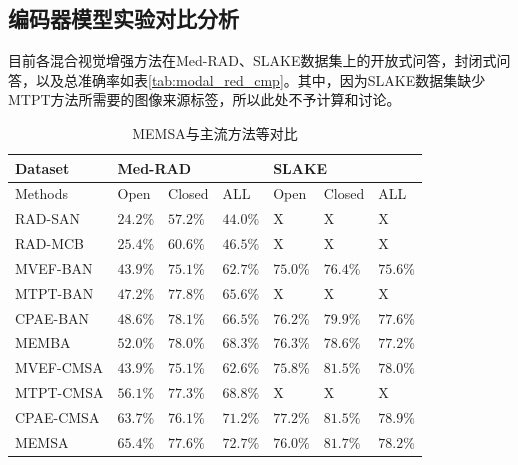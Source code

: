 \subsection{编码器模型实验对比分析}
目前各混合视觉增强方法在Med-RAD、SLAKE数据集上的开放式问答，封闭式问答，以及总准确率如表\ref{tab:modal_red_cmp}。其中，因为SLAKE数据集缺少MTPT方法所需要的图像来源标签，所以此处不予计算和讨论。
\begin{table}
	\caption{\label{tab:modal_red_cmp1}MEMSA与主流方法等对比}
	\centering
	\small
	\begin{tabular}{l|lll|lll}
		\hline Dataset & \multicolumn{3}{l}{\textbf{Med-RAD}} & \multicolumn{3}{|l}{\textbf{SLAKE}} \\ 
		\hline Methods & Open & Closed & ALL & Open & Closed & ALL\\
		\hline RAD-SAN\cite{lau2018dataset} & $24.2 \%$ & $57.2 \%$ & $44.0 \%$ & X & X & X\\
		RAD-MCB\cite{lau2018dataset} & $25.4 \%$ & $60.6 \%$ & $46.5 \%$ & X & X & X\\
		\hline MVEF-BAN \cite{nguyen2019overcoming} & $43.9 \%$ & $75.1 \%$ & $62.7 \%$ & $75.0 \%$ & $76.4 \%$ & $75.6 \%$ \\
		MTPT-BAN & $47.2 \%$ & $77.8 \%$ & $65.6 \%$ & X & X & X\\
		CPAE-BAN\cite{eslami2021does} & $48.6 \%$ & $78.1 \%$ & $66.5 \%$ & $76.2 \%$ & $79.9 \%$ & $77.6 \%$\\
		MEMBA & $52.0 \%$ & $78.0 \%$ & $68.3 \%$ & $76.3 \%$ & $78.6 \%$ & $77.2 \%$\\
		\hline MVEF-CMSA & $43.9 \%$ & $75.1 \%$ & $62.6 \%$ & $75.8 \%$ & $81.5 \%$ & $78.0 \%$\\
		MTPT-CMSA\cite{gong2021cross} & $56.1 \%$ & $77.3 \%$ & $68.8 \%$ & X & X & X\\
		CPAE-CMSA & $63.7 \%$ & $76.1 \%$ & $71.2 \%$ & $77.2 \%$ & $81.5 \%$ & $78.9 \%$\\
		MEMSA & $\mathbf{65.4 \%}$ & $\mathbf{77.6 \%}$ & $\mathbf{72.7 \%}$ & $76.0 \%$ & $\mathbf{81.7 \%}$ & $78.2 \%$\\
		\hline
		\end{tabular}
\end{table}

